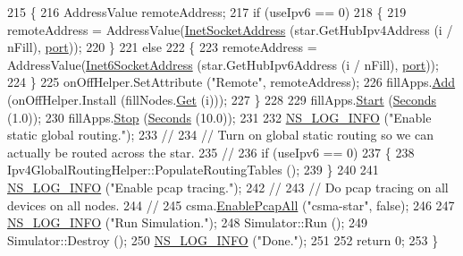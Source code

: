 \begin{DoxyCode}
215     \{
216       AddressValue remoteAddress;
217       \textcolor{keywordflow}{if} (useIpv6 == 0)
218         \{
219           remoteAddress = AddressValue(\hyperlink{classns3_1_1InetSocketAddress}{InetSocketAddress} (star.GetHubIpv4Address (i / 
      nFill), \hyperlink{dsdv-manet_8cc_a8e0798404bf2cf5dabb84c5ba9a4f236}{port}));
220         \}
221       \textcolor{keywordflow}{else}
222         \{
223           remoteAddress = AddressValue(\hyperlink{classns3_1_1Inet6SocketAddress}{Inet6SocketAddress} (star.GetHubIpv6Address (i / 
      nFill), \hyperlink{dsdv-manet_8cc_a8e0798404bf2cf5dabb84c5ba9a4f236}{port}));
224         \}
225       onOffHelper.SetAttribute (\textcolor{stringliteral}{"Remote"}, remoteAddress);
226       fillApps.\hyperlink{classns3_1_1ApplicationContainer_ad09ab1a1ad5849d518d5f4c262e38152}{Add} (onOffHelper.Install (fillNodes.\hyperlink{classns3_1_1NodeContainer_a9ed96e2ecc22e0f5a3d4842eb9bf90bf}{Get} (i)));
227     \}
228 
229   fillApps.\hyperlink{classns3_1_1ApplicationContainer_a8eff87926507020bbe3e1390358a54a7}{Start} (\hyperlink{group__timecivil_ga33c34b816f8ff6628e33d5c8e9713b9e}{Seconds} (1.0));
230   fillApps.\hyperlink{classns3_1_1ApplicationContainer_adfc52f9aa4020c8714679b00bbb9ddb3}{Stop} (\hyperlink{group__timecivil_ga33c34b816f8ff6628e33d5c8e9713b9e}{Seconds} (10.0));
231 
232   \hyperlink{group__logging_gafbd73ee2cf9f26b319f49086d8e860fb}{NS\_LOG\_INFO} (\textcolor{stringliteral}{"Enable static global routing."});
233   \textcolor{comment}{//}
234   \textcolor{comment}{// Turn on global static routing so we can actually be routed across the star.}
235   \textcolor{comment}{//}
236   \textcolor{keywordflow}{if} (useIpv6 == 0)
237     \{
238       Ipv4GlobalRoutingHelper::PopulateRoutingTables ();
239     \}
240 
241   \hyperlink{group__logging_gafbd73ee2cf9f26b319f49086d8e860fb}{NS\_LOG\_INFO} (\textcolor{stringliteral}{"Enable pcap tracing."});
242   \textcolor{comment}{//}
243   \textcolor{comment}{// Do pcap tracing on all devices on all nodes.}
244   \textcolor{comment}{//}
245   csma.\hyperlink{classns3_1_1PcapHelperForDevice_a4ab183a2512120200d4a0e5d8ececd49}{EnablePcapAll} (\textcolor{stringliteral}{"csma-star"}, \textcolor{keyword}{false});
246 
247   \hyperlink{group__logging_gafbd73ee2cf9f26b319f49086d8e860fb}{NS\_LOG\_INFO} (\textcolor{stringliteral}{"Run Simulation."});
248   Simulator::Run ();
249   Simulator::Destroy ();
250   \hyperlink{group__logging_gafbd73ee2cf9f26b319f49086d8e860fb}{NS\_LOG\_INFO} (\textcolor{stringliteral}{"Done."});
251 
252   \textcolor{keywordflow}{return} 0;
253 \}
\end{DoxyCode}


